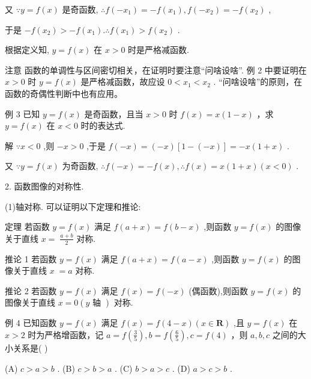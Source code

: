 \documentclass[10pt]{article}
\begin{document}
又 \(\because y = f\left( x\right)\) 是奇函数, \(\therefore f\left( {-{x}_{1}}\right)  =  - f\left( {x}_{1}\right) ,f\left( {-{x}_{2}}\right)  =  - f\left( {x}_{2}\right)\) ,

于是 \(- f\left( {x}_{2}\right)  >  - f\left( {x}_{1}\right) .\therefore f\left( {x}_{1}\right)  > f\left( {x}_{2}\right)\) .

根据定义知, \(y = f\left( x\right)\) 在 \(x > 0\) 时是严格减函数.

注意 函数的单调性与区间密切相关，在证明时要注意“问啥设啥”. 例 2 中要证明在 \(x > 0\) 时 \(y = f\left( x\right)\) 是严格减函数，故应设 \(0 < {x}_{1} < {x}_{2}\) . “问啥设啥”的原则，在函数的奇偶性判断中也有应用。

例 3 已知 \(y = f\left( x\right)\) 是奇函数，且当 \(x > 0\) 时 \(f\left( x\right)  = x\left( {1 - x}\right)\) ，求 \(y = f\left( x\right)\) 在 \(x < 0\) 时的表达式.

解 \(\because x < 0\) ,则 \(- x > 0\) ,于是 \(f\left( {-x}\right)  = \left( {-x}\right) \left\lbrack  {1 - \left( {-x}\right) }\right\rbrack   =  - x\left( {1 + x}\right)\) .

又 \(\because y = f\left( x\right)\) 为奇函数, \(\therefore f\left( {-x}\right)  =  - f\left( x\right) ,\therefore f\left( x\right)  = x\left( {1 + x}\right) \left( {x < 0}\right)\) .

2. 函数图像的对称性.

(1)轴对称. 可以证明以下定理和推论:

定理 若函数 \(y = f\left( x\right)\) 满足 \(f\left( {a + x}\right)  = f\left( {b - x}\right)\) ,则函数 \(y = f\left( x\right)\) 的图像关于直线 \(x = \; \frac{a + b}{2}\) 对称.

推论 1 若函数 \(y = f\left( x\right)\) 满足 \(f\left( {a + x}\right)  = f\left( {a - x}\right)\) ,则函数 \(y = f\left( x\right)\) 的图像关于直线 \(x \; = a\) 对称.

推论 2 若函数 \(y = f\left( x\right)\) 满足 \(f\left( x\right)  = f\left( {-x}\right)\) (偶函数),则函数 \(y = f\left( x\right)\) 的图像关于直线 \(x = 0\left( {y\text{ 轴 }}\right)\) 对称.

例 4 已知函数 \(y = f\left( x\right)\) 满足 \(f\left( x\right)  = f\left( {4 - x}\right) \left( {x \in  \mathbf{R}}\right)\) ,且 \(y = f\left( x\right)\) 在 \(x > 2\) 时为严格增函数，记 \(a = f\left( \frac{3}{5}\right) ,b = f\left( \frac{6}{5}\right) ,c = f\left( 4\right)\) ，则 \(a,b,c\) 之间的大小关系是( )

(A) \(c > a > b\) . (B) \(c > b > a\) . (C) \(b > a > c\) . (D) \(a > c > b\) .
\end{document}
